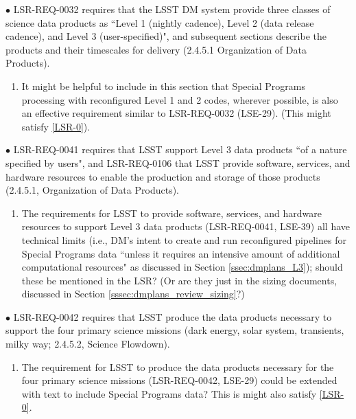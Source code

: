 \documentclass[DM,lsstdraft,toc]{lsstdoc}
\begin{document}
$\bullet$ LSR-REQ-0032 requires that the LSST DM system provide three classes of science data products as ``Level 1 (nightly cadence), Level 2 (data release cadence), and Level 3 (user-specified)", and subsequent sections describe the products and their timescales for delivery (2.4.5.1 Organization of Data Products).
\begin{enumerate}[topsep=-10pt,after=\vspace{10pt},label= \textbf{Concern \Roman*.},resume] \item \label{LSR-3} It might be helpful to include in this section that Special Programs processing with reconfigured Level 1 and 2 codes, wherever possible, is also an effective requirement similar to LSR-REQ-0032 (LSE-29). (This might satisfy \ref{LSR-0}). \end{enumerate}

$\bullet$ LSR-REQ-0041 requires that LSST support Level 3 data products ``of a nature specified by users", and LSR-REQ-0106 that LSST provide software, services, and hardware resources to enable the production and storage of those products (2.4.5.1, Organization of Data Products).
\begin{enumerate}[topsep=-10pt,after=\vspace{10pt},label= \textbf{Concern \Roman*.},resume] \item \label{LSR-4} The requirements for LSST to provide software, services, and hardware resources to support Level 3 data products (LSR-REQ-0041, LSE-39) all have technical limits (i.e., DM's intent to create and run reconfigured pipelines for Special Programs data ``unless it requires an intensive amount of additional computational resources" as discussed in Section \ref{ssec:dmplans_L3}); should these be mentioned in the LSR? (Or are they just in the sizing documents, discussed in Section \ref{sssec:dmplans_review_sizing}?)  \end{enumerate}

$\bullet$ LSR-REQ-0042 requires that LSST produce the data products necessary to support the four primary science missions (dark energy, solar system, transients, milky way; 2.4.5.2, Science Flowdown). 
\begin{enumerate}[topsep=-10pt,after=\vspace{10pt},label= \textbf{Concern \Roman*.},resume] \item \label{LSR-5} The requirement for LSST to produce the data products necessary for the four primary science missions (LSR-REQ-0042, LSE-29) could be extended with text to include Special Programs data? This is might also satisfy \ref{LSR-0}. \end{enumerate}
\end{document}
